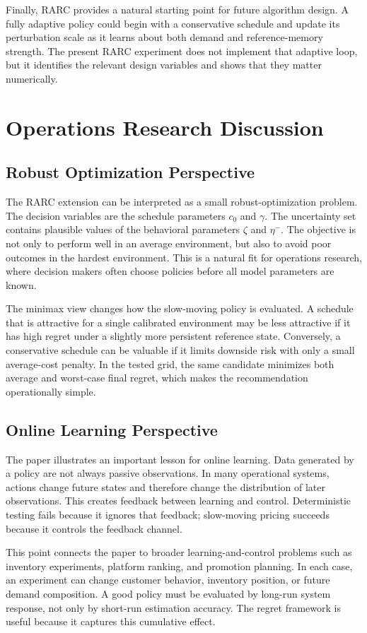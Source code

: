 \documentclass[conference]{../../LaTex_Template/IEEEtran}
\begin{document}
Finally, RARC provides a natural starting point for future algorithm design. A fully adaptive policy could begin with a conservative schedule and update its perturbation scale as it learns about both demand and reference-memory strength. The present RARC experiment does not implement that adaptive loop, but it identifies the relevant design variables and shows that they matter numerically.

\section{Operations Research Discussion}
\subsection{Robust Optimization Perspective}
The RARC extension can be interpreted as a small robust-optimization problem. The decision variables are the schedule parameters $c_0$ and $\gamma$. The uncertainty set contains plausible values of the behavioral parameters $\zeta$ and $\eta^-$. The objective is not only to perform well in an average environment, but also to avoid poor outcomes in the hardest environment. This is a natural fit for operations research, where decision makers often choose policies before all model parameters are known.

The minimax view changes how the slow-moving policy is evaluated. A schedule that is attractive for a single calibrated environment may be less attractive if it has high regret under a slightly more persistent reference state. Conversely, a conservative schedule can be valuable if it limits downside risk with only a small average-cost penalty. In the tested grid, the same candidate minimizes both average and worst-case final regret, which makes the recommendation operationally simple.

\subsection{Online Learning Perspective}
The paper illustrates an important lesson for online learning. Data generated by a policy are not always passive observations. In many operational systems, actions change future states and therefore change the distribution of later observations. This creates feedback between learning and control. Deterministic testing fails because it ignores that feedback; slow-moving pricing succeeds because it controls the feedback channel.

This point connects the paper to broader learning-and-control problems such as inventory experiments, platform ranking, and promotion planning. In each case, an experiment can change customer behavior, inventory position, or future demand composition. A good policy must be evaluated by long-run system response, not only by short-run estimation accuracy. The regret framework is useful because it captures this cumulative effect.
\end{document}
